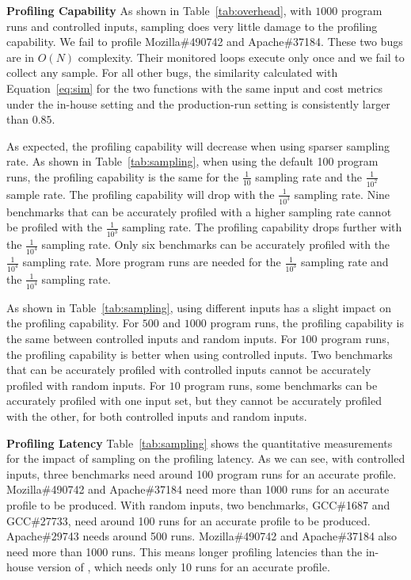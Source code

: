 \noindent\textbf{Profiling Capability}
As shown in Table~\ref{tab:overhead}, 
with $1000$ program runs and controlled inputs, 
sampling does very little damage to the profiling capability. 
We fail to profile Mozilla\#490742 and Apache\#37184.
These two bugs are in $O(N)$ complexity. 
Their monitored loops execute only once 
and we fail to collect any sample.
For all other bugs, 
the similarity calculated with Equation~\ref{eq:sim} for the two functions with the same input and cost metrics
under the in-house setting and the production-run setting is consistently larger than $0.85$.

As expected, the profiling capability will decrease when using sparser sampling rate. 
As shown in Table~\ref{tab:sampling}, 
when using the default 100 program runs,
the profiling capability is the same for the $\frac{1}{10}$ sampling rate 
and the $\frac{1}{10^2}$ sample rate.
The profiling capability will drop with the $\frac{1}{10^3}$ sampling rate. 
Nine benchmarks that can be accurately profiled with a higher sampling rate
cannot be profiled with the $\frac{1}{10^3}$ sampling rate.
The profiling capability drops further with the $\frac{1}{10^4}$ sampling rate. 
Only six benchmarks can be accurately profiled with the $\frac{1}{10^4}$ sampling rate. 
More program runs are needed for the $\frac{1}{10^3}$ sampling rate 
and the $\frac{1}{10^4}$ sampling rate. 

As shown in Table~\ref{tab:sampling}, 
using different inputs has a slight impact on the profiling capability. 
For $500$ and $1000$ program runs, 
the profiling capability is the same between controlled inputs and random inputs. 
For $100$ program runs, 
the profiling capability is better when using controlled inputs.
Two benchmarks that can be accurately profiled with controlled inputs 
cannot be accurately profiled with random inputs.
For $10$ program runs, 
some benchmarks can be accurately 
profiled with one input set, but they cannot 
be accurately profiled with the other, 
for both controlled inputs and random inputs.

\noindent\textbf{Profiling Latency}
Table~\ref{tab:sampling} shows the quantitative measurements for the impact of sampling on the profiling latency.
As we can see, with controlled inputs, 
three benchmarks need around 100 program runs for an accurate profile. 
Mozilla\#490742 and Apache\#37184 need more than 1000 runs for an accurate profile to be produced. 
With random inputs, two benchmarks, GCC\#1687 and GCC\#27733, 
need around 100 runs for an accurate profile to be produced. 
Apache\#29743 needs around 500 runs. 
Mozilla\#490742 and Apache\#37184 also need more than 1000 runs.   
This means longer profiling latencies than the in-house version of \Tool,
which needs only 10 runs for an accurate profile. 


